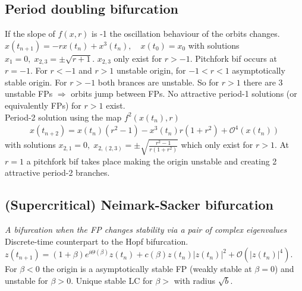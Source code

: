 \subsection{Period doubling bifurcation}
If the slope of $f(x,r)$ is -1 the oscillation behaviour of the orbits changes.\\
$x(t_{n+1})=-rx(t_n)+x^3(t_n), \quad x(t_0)=x_0$ with solutions $x_1=0, \; x_{2,3}=\pm\sqrt{r+1}$. $x_{2,3}$ only exist for $r>-1$. Pitchfork bif occurs at $r=-1$. For $r<-1$ and $r>1$ unstable origin, for $-1<r<1$ asymptotically stable origin. For $r>-1$ both brances are unstable. So for $r>1$ there are 3 unstable FPs $\Rightarrow$ orbits jump between FPs. No attractive period-1 solutions (or equivalently FPs) for $r>1$ exist.\\
Period-2 solution using the map $f^2(x(t_n),r)$
\begin{align*}
x(t_{n+2})=x(t_n)(r^2-1)- x^3(t_n)r(1+r^2) + \mathcal{O}^4(x(t_n))
\end{align*}
with solutions $x_{2,1}=0, \; x_{2,(2,3)} = \pm \sqrt{\frac{r^2-1}{r(1+r^2)}}$ which only exist for $r>1$. At $r=1$ a pitchfork bif takes place making the origin unstable and creating 2 attractive period-2 branches.

\begin{center}
\end{center}

\subsection{(Supercritical) Neimark-Sacker bifurcation}
\emph{A bifurcation when the FP changes stability via a pair of complex eigenvalues}
Discrete-time counterpart to the Hopf bifurcation.\\
$z(t_{n+1}) = (1+\beta)e^{i\Theta(\beta)}z(t_n)+c(\beta)z(t_n)|z(t_n)|^2 + \mathcal{O}(|z(t_n)|^4)$. For $\beta<0$ the origin is a asymptotically stable FP (weakly stable at $\beta=0$) and unstable for $\beta>0$. Unique stable LC for $\beta>$ with radius $\sqrt{b}$.